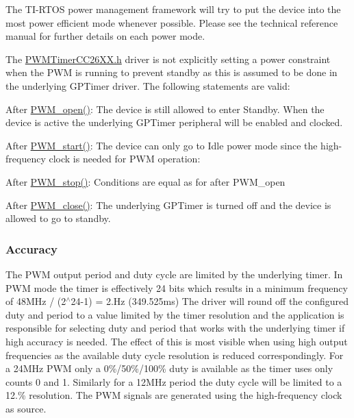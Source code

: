 The T\+I-\/\+R\+T\+O\+S power management framework will try to put the device into the most power efficient mode whenever possible. Please see the technical reference manual for further details on each power mode.

The \hyperlink{_p_w_m_timer_c_c26_x_x_8h}{P\+W\+M\+Timer\+C\+C26\+X\+X.\+h} driver is not explicitly setting a power constraint when the P\+W\+M is running to prevent standby as this is assumed to be done in the underlying G\+P\+Timer driver. The following statements are valid\+:
\begin{DoxyItemize}
\item After \hyperlink{_p_w_m_8h_ac963beab0c5c6901bf852f175028aeaf}{P\+W\+M\+\_\+open()}\+: The device is still allowed to enter Standby. When the device is active the underlying G\+P\+Timer peripheral will be enabled and clocked.
\item After \hyperlink{_p_w_m_8h_aa1bd0cc3f0fa52879422fca74d254378}{P\+W\+M\+\_\+start()}\+: The device can only go to Idle power mode since the high-\/frequency clock is needed for P\+W\+M operation\+:
\item After \hyperlink{_p_w_m_8h_ae83a4cd327a07d6037ff1a8d72fb3ae6}{P\+W\+M\+\_\+stop()}\+: Conditions are equal as for after P\+W\+M\+\_\+open
\item After \hyperlink{_p_w_m_8h_a0e0f5899b067d27653db566fb148db11}{P\+W\+M\+\_\+close()}\+: The underlying G\+P\+Timer is turned off and the device is allowed to go to standby.
\end{DoxyItemize}

\subsubsection*{Accuracy}

The P\+W\+M output period and duty cycle are limited by the underlying timer. In P\+W\+M mode the timer is effectively 24 bits which results in a minimum frequency of 48\+M\+Hz / (2$^\wedge$24-\/1) = 2.\+Hz (349.\+525ms) The driver will round off the configured duty and period to a value limited by the timer resolution and the application is responsible for selecting duty and period that works with the underlying timer if high accuracy is needed. The effect of this is most visible when using high output frequencies as the available duty cycle resolution is reduced correspondingly. For a 24\+M\+Hz P\+W\+M only a 0\%/50\%/100\% duty is available as the timer uses only counts 0 and 1. Similarly for a 12\+M\+Hz period the duty cycle will be limited to a 12.\% resolution. The P\+W\+M signals are generated using the high-\/frequency clock as source.

